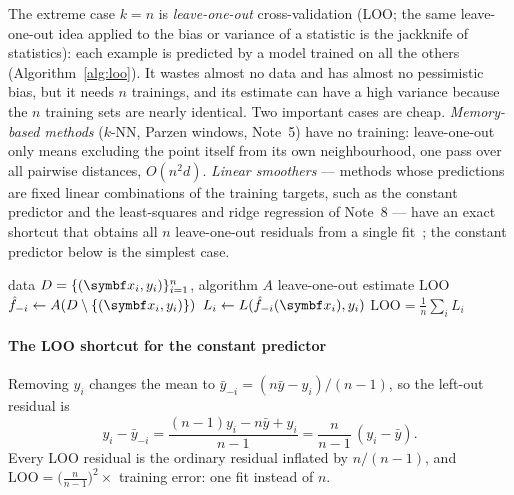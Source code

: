 \documentclass[11pt]{article}
\begin{document}
The extreme case $k = n$ is \emph{leave-one-out} cross-validation (LOO; the same leave-one-out idea applied to the bias
or variance of a statistic is the jackknife of statistics): each example is predicted
by a model trained on all the others (Algorithm~\ref{alg:loo}). It wastes almost no data and has almost no
pessimistic bias, but it needs $n$ trainings, and its estimate can have a high variance because the $n$ training sets
are nearly identical. Two important cases are cheap. \emph{Memory-based methods} ($k$-NN, Parzen windows, Note~5)
have no training: leave-one-out only means excluding the point itself from its own neighbourhood, one pass over all
pairwise distances, $O(n^2 d)$. \emph{Linear smoothers} --- methods whose predictions are fixed linear combinations of the training targets, such as
the constant predictor and the least-squares and ridge regression of Note~8 --- have an exact
shortcut that obtains all $n$ leave-one-out residuals from a single fit~\cite{hastie2009}; the constant predictor
below is the simplest case.

\begin{algorithm}[htbp]\small
\caption{Leave-one-out cross-validation}
\label{alg:loo}
\begin{algorithmic}[1]
\Require data $D = \{(\x_i, y_i)\}_{i=1}^n$, algorithm $A$
\Ensure leave-one-out estimate $\mathrm{LOO}$
    \State $\hat f_{-i} \gets A(D \setminus \{(\x_i, y_i)\})$
    \State $L_i \gets L(\hat f_{-i}(\x_i), y_i)$
  \EndFor
  \State \Return $\mathrm{LOO} = \frac1n \sum_i L_i$
\EndFunction
\end{algorithmic}
\end{algorithm}

\paragraph{The LOO shortcut for the constant predictor} Removing $y_i$ changes the mean to
$\bar y_{-i} = (n\bar y - y_i)/(n-1)$, so the left-out residual is
\[
  y_i - \bar y_{-i} = \frac{(n-1)y_i - n\bar y + y_i}{n-1} = \frac{n}{n-1}\,(y_i - \bar y) .
\]
Every LOO residual is the ordinary residual inflated by $n/(n-1)$, and
$\mathrm{LOO} = \big(\tfrac{n}{n-1}\big)^2 \times$ training error: one fit instead of $n$.
\end{document}
